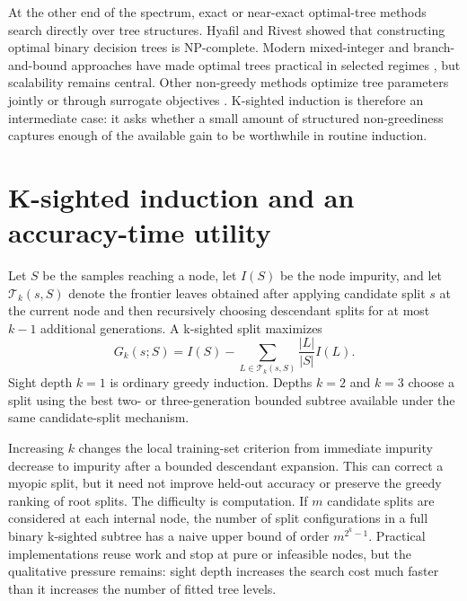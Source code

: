 \documentclass[pdflatex,sn-mathphys-num]{sn-jnl}
\begin{document}
At the other end of the spectrum, exact or near-exact optimal-tree methods search directly over tree structures. Hyafil and Rivest \cite{hyafil1976constructing} showed that constructing optimal binary decision trees is NP-complete. Modern mixed-integer and branch-and-bound approaches have made optimal trees practical in selected regimes \cite{bertsimas2017optimal,verwer2019learning,hu2019optimal,lin2020generalized,aghaei2025strong}, but scalability remains central. Other non-greedy methods optimize tree parameters jointly or through surrogate objectives \cite{norouzi2015efficient}. K-sighted induction is therefore an intermediate case: it asks whether a small amount of structured non-greediness captures enough of the available gain to be worthwhile in routine induction.

\section{K-sighted induction and an accuracy-time utility}\label{sec:method}

Let $S$ be the samples reaching a node, let $I(S)$ be the node impurity, and let $\mathcal{T}_k(s,S)$ denote the frontier leaves obtained after applying candidate split $s$ at the current node and then recursively choosing descendant splits for at most $k-1$ additional generations. A k-sighted split maximizes
\begin{equation}
G_k(s;S) =
I(S) -
\sum_{L \in \mathcal{T}_k(s,S)}
\frac{|L|}{|S|} I(L).
\label{eq:sighted}
\end{equation}
Sight depth $k=1$ is ordinary greedy induction. Depths $k=2$ and $k=3$ choose a split using the best two- or three-generation bounded subtree available under the same candidate-split mechanism.

Increasing $k$ changes the local training-set criterion from immediate impurity decrease to impurity after a bounded descendant expansion. This can correct a myopic split, but it need not improve held-out accuracy or preserve the greedy ranking of root splits. The difficulty is computation. If $m$ candidate splits are considered at each internal node, the number of split configurations in a full binary k-sighted subtree has a naive upper bound of order $m^{2^k-1}$. Practical implementations reuse work and stop at pure or infeasible nodes, but the qualitative pressure remains: sight depth increases the search cost much faster than it increases the number of fitted tree levels.
\end{document}
